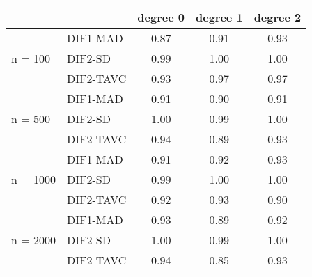 \begin{tabular}{|l|l|c|c|c|}
  \hline
 &  & degree 0 & degree 1 & degree 2 \\ 
  \hline
 & DIF1-MAD & 0.87 & 0.91 & 0.93 \\ 
  n = 100 & DIF2-SD & 0.99 & 1.00 & 1.00 \\ 
   & DIF2-TAVC & 0.93 & 0.97 & 0.97 \\ 
   & DIF1-MAD & 0.91 & 0.90 & 0.91 \\ 
  n = 500 & DIF2-SD & 1.00 & 0.99 & 1.00 \\ 
   & DIF2-TAVC & 0.94 & 0.89 & 0.93 \\ 
   & DIF1-MAD & 0.91 & 0.92 & 0.93 \\ 
  n = 1000 & DIF2-SD & 0.99 & 1.00 & 1.00 \\ 
   & DIF2-TAVC & 0.92 & 0.93 & 0.90 \\ 
   & DIF1-MAD & 0.93 & 0.89 & 0.92 \\ 
  n = 2000 & DIF2-SD & 1.00 & 0.99 & 1.00 \\ 
   & DIF2-TAVC & 0.94 & 0.85 & 0.93 \\ 
   \hline
\end{tabular}
